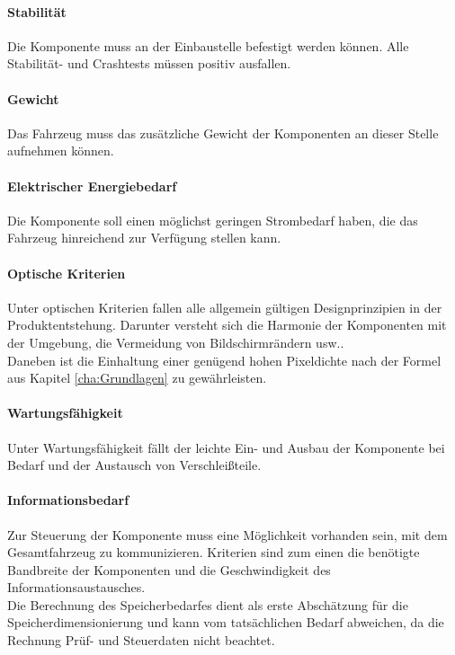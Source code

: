 \paragraph{Stabilität}
Die Komponente muss an der Einbaustelle befestigt werden können. Alle Stabilität- und Crashtests müssen positiv ausfallen.
\paragraph{Gewicht}
Das Fahrzeug muss das zusätzliche Gewicht der Komponenten an dieser Stelle aufnehmen können.
\paragraph{Elektrischer Energiebedarf}
Die Komponente soll einen möglichst geringen Strombedarf haben, die das Fahrzeug hinreichend zur Verfügung stellen kann.
\paragraph{Optische Kriterien}
Unter optischen Kriterien fallen alle allgemein gültigen Designprinzipien in der Produktentstehung. Darunter versteht sich die Harmonie der Komponenten mit der Umgebung, die Vermeidung von Bildschirmrändern usw.. \\
Daneben ist die Einhaltung einer genügend hohen Pixeldichte nach der Formel aus Kapitel \ref{cha:Grundlagen} zu gewährleisten.
\paragraph{Wartungsfähigkeit}
Unter Wartungsfähigkeit fällt der leichte Ein- und Ausbau der Komponente bei Bedarf und der Austausch von Verschleißteile.
\paragraph{Informationsbedarf}
Zur Steuerung der Komponente muss eine Möglichkeit vorhanden sein, mit dem Gesamtfahrzeug zu kommunizieren. Kriterien sind zum einen die benötigte Bandbreite der Komponenten und die Geschwindigkeit des Informationsaustausches. \\
Die Berechnung des Speicherbedarfes dient als erste Abschätzung für die Speicherdimensionierung und kann vom tatsächlichen Bedarf abweichen, da die Rechnung Prüf- und Steuerdaten nicht beachtet.
